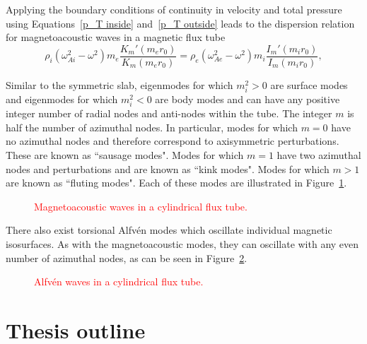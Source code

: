 \documentclass[12pt]{../style-files/ociamthesis}
\begin{document}
Applying the boundary conditions of continuity in velocity and total pressure using Equations~\eqref{p_T inside} and~\eqref{p_T outside} leads to the dispersion relation for magnetoacoustic waves in a magnetic flux tube
\begin{equation}
\rho_i(\omega_{Ai}^2 - \omega^2)m_e\frac{K_m'(m_er_0)}{K_m(m_er_0)} = \rho_e(\omega_{Ae}^2 - \omega^2)m_i\frac{I_m'(m_ir_0)}{I_m(m_ir_0)},
\end{equation}

Similar to the symmetric slab, eigenmodes for which $m_i^2 > 0$ are surface modes and eigenmodes for which $m_i^2 < 0$ are body modes and can have any positive integer number of radial nodes and anti-nodes within the tube. The integer $m$ is half the number of azimuthal nodes. In particular, modes for which $m = 0$ have no azimuthal nodes and therefore correspond to axisymmetric perturbations. These are known as ``sausage modes". Modes for which $m = 1$ have two azimuthal nodes and perturbations and are known as ``kink modes". Modes for which $m > 1$ are known as ``fluting modes". Each of these modes are illustrated in Figure~\ref{fig: magnetoacoustic waves flux tube}.
\begin{figure}
	\caption{\textcolor{red}{Magnetoacoustic waves in a cylindrical flux tube.}}
	\label{fig: magnetoacoustic waves flux tube}
\end{figure}

There also exist torsional Alfv\'{e}n modes which oscillate individual magnetic isosurfaces. As with the magnetoacoustic modes, they can oscillate with any even number of azimuthal nodes, as can be seen in Figure~\ref{fig: alvfen modes flux tube}.
\begin{figure}
	\caption{\textcolor{red}{Alfv\'{e}n waves in a cylindrical flux tube.}}
	\label{fig: alvfen modes flux tube}
\end{figure}



\section{Thesis outline}
\label{sec:outline}
\end{document}
